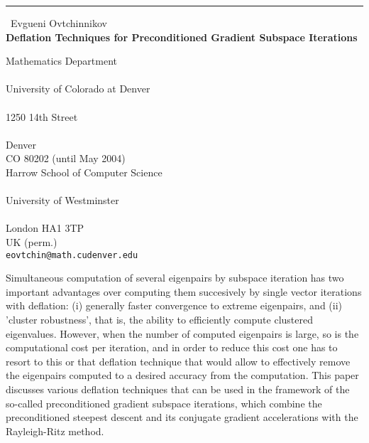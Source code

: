 \documentclass{report}
\begin{document}
\begin{center}
\rule{6in}{1pt} \
{\large Evgueni Ovtchinnikov \\
{\bf Deflation Techniques for Preconditioned Gradient Subspace Iterations}}

Mathematics Department \\ \\ University of Colorado at Denver \\ \\ 1250 14th Street \\ \\ Denver \\ CO 80202 (until May 2004) \\ Harrow School of Computer Science \\ \\ University of Westminster \\ \\ London HA1 3TP \\ UK (perm.)
\\
{\tt eovtchin@math.cudenver.edu}\end{center}

Simultaneous computation of several eigenpairs by subspace iteration has
two important advantages over computing them succesively by single vector
iterations with deflation: (i) generally faster convergence to extreme
eigenpairs, and (ii) 'cluster robustness', that is, the ability to
efficiently compute clustered eigenvalues. However, when the number of
computed eigenpairs is large, so is the computational cost per iteration,
and in order to reduce this cost one has to resort to this or that
deflation technique that would allow to effectively remove the eigenpairs
computed to a desired accuracy from the computation. This paper discusses
various deflation techniques that can be used in the framework of the
so-called preconditioned gradient subspace iterations, which combine the
preconditioned steepest descent and its conjugate gradient accelerations
with the Rayleigh-Ritz method.
\end{document}
